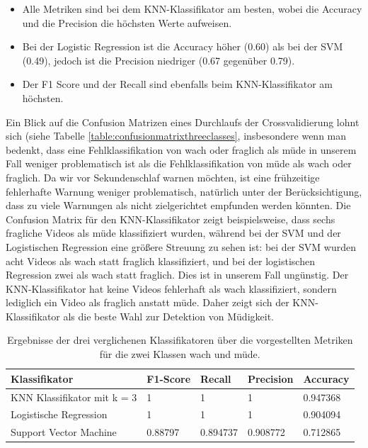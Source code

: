 \begin{itemize}
\item Alle Metriken sind bei dem KNN-Klassifikator am besten, wobei die Accuracy und die Precision die höchsten Werte aufweisen.
\item Bei der Logistic Regression ist die Accuracy höher (0.60) als bei der SVM (0.49), jedoch ist die Precision niedriger (0.67 gegenüber 0.79).
\item Der F1 Score und der Recall sind ebenfalls beim KNN-Klassifikator am höchsten.
\end{itemize}

Ein Blick auf die Confusion Matrizen eines Durchlaufs der Crossvalidierung lohnt sich (siehe Tabelle \ref{table:confusionmatrixthreeclasses}, insbesondere wenn man bedenkt, dass eine Fehlklassifikation von \glqq wach\grqq{} oder \glqq fraglich\grqq{} als \glqq müde\grqq{} in unserem Fall weniger problematisch ist als die Fehlklassifikation von \glqq müde\grqq{} als \glqq wach\grqq{} oder \glqq fraglich\grqq{}. Da wir vor Sekundenschlaf warnen möchten, ist eine frühzeitige fehlerhafte Warnung weniger problematisch, natürlich unter der Berücksichtigung, dass zu viele Warnungen als nicht zielgerichtet empfunden werden könnten. Die Confusion Matrix für den KNN-Klassifikator zeigt beispielsweise, dass sechs \glqq fragliche\grqq{} Videos als \glqq müde\grqq{} klassifiziert wurden, während bei der SVM und der Logistischen Regression eine größere Streuung zu sehen ist: bei der SVM wurden acht Videos als \glqq wach\grqq{} statt \glqq fraglich\grqq{} klassifiziert, und bei der logistischen Regression zwei als \glqq wach\grqq{} statt \glqq fraglich\grqq{}. Dies ist in unserem Fall ungünstig. Der KNN-Klassifikator hat keine Videos fehlerhaft als \glqq wach\grqq{} klassifiziert, sondern lediglich ein Video als \glqq fraglich\grqq{} anstatt \glqq müde\grqq{}. Daher zeigt sich der KNN-Klassifikator als die beste Wahl zur Detektion von Müdigkeit.

\begin{table}
    \centering
    \begin{tabular}{|l|l|l|l|l|}
    \hline
        {Klassifikator} & {F1-Score} & {Recall} & {Precision} & {Accuracy} \\ \hline
        {KNN Klassifikator mit k = 3} & 1 & 1 & 1 & 0.947368 \\ \hline
        {Logistische Regression} & 1 & 1 & 1 & 0.904094 \\ \hline
        {Support Vector Machine} & 0.88797 & 0.894737 & 0.908772 & 0.712865 \\ \hline
    \end{tabular}
\caption{Ergebnisse der drei verglichenen Klassifikatoren über die vorgestellten Metriken für die zwei Klassen wach und müde.}
\label{table:twoclassificator}
\end{table}

